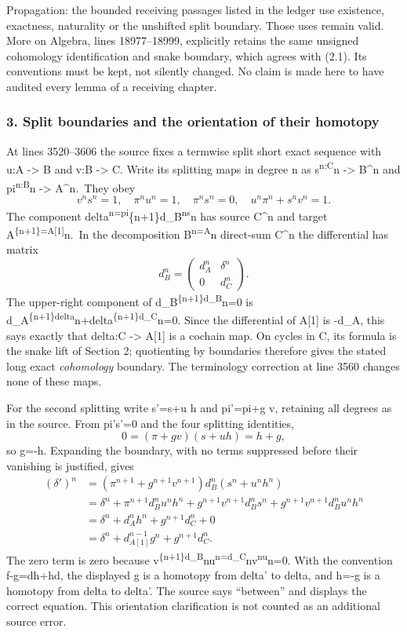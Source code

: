 Propagation: the bounded receiving passages listed in the ledger use existence, exactness, naturality or the unshifted split boundary. Those uses remain valid. More on Algebra, lines 18977--18999, explicitly retains the same unsigned cohomology identification and snake boundary, which agrees with (2.1). Its conventions must be kept, not silently changed. No claim is made here to have audited every lemma of a receiving chapter.

\subsubsection{3. Split boundaries and the orientation of their homotopy}\label{split-boundaries-and-the-orientation-of-their-homotopy}

At lines 3520--3606 the source fixes a termwise split short exact sequence with u:A -\textgreater{} B and v:B -\textgreater{} C. Write its splitting maps in degree n as s\textsuperscript{n:C}n -\textgreater{} B\^{}n and pi\textsuperscript{n:B}n -\textgreater{} A\^{}n.~They obey \[
v^ns^n=1,\quad \pi^nu^n=1,\quad \pi^ns^n=0,\quad
u^n\pi^n+s^nv^n=1.
\] The component delta\textsuperscript{n=pi}\{n+1\}d\_B\textsuperscript{ns}n has source C\^{}n and target A\textsuperscript{\{n+1\}=A{[}1{]}}n.~In the decomposition B\textsuperscript{n=A}n direct-sum C\^{}n the differential has matrix \[
d_B^n=
\begin{pmatrix}d_A^n&\delta^n\\0&d_C^n\end{pmatrix}.
\] The upper-right component of d\_B\textsuperscript{\{n+1\}d\_B}n=0 is d\_A\textsuperscript{\{n+1\}delta}n+delta\textsuperscript{\{n+1\}d\_C}n=0. Since the differential of A{[}1{]} is -d\_A, this says exactly that delta:C -\textgreater{} A{[}1{]} is a cochain map. On cycles in C, its formula is the snake lift of Section 2; quotienting by boundaries therefore gives the stated long exact \emph{cohomology} boundary. The terminology correction at line 3560 changes none of these maps.

For the second splitting write s'=s+u h and pi'=pi+g v, retaining all degrees as in the source. From pi's'=0 and the four splitting identities, \[
0=(\pi+gv)(s+uh)=h+g,
\] so g=-h. Expanding the boundary, with no terms suppressed before their vanishing is justified, gives \[
\begin{aligned}
(\delta')^n
&=(\pi^{n+1}+g^{n+1}v^{n+1})d_B^n(s^n+u^nh^n)\\
&=\delta^n+
  \pi^{n+1}d_B^nu^nh^n+
  g^{n+1}v^{n+1}d_B^ns^n+
  g^{n+1}v^{n+1}d_B^nu^nh^n\\
&=\delta^n+d_A^nh^n+g^{n+1}d_C^n+0\\
&=\delta^n+d_{A[1]}^{n-1}g^n+g^{n+1}d_C^n .
\end{aligned}
\] The zero term is zero because v\textsuperscript{\{n+1\}d\_B}nu\textsuperscript{n=d\_C}nv\textsuperscript{nu}n=0. With the convention f-g=dh+hd, the displayed g is a homotopy from delta' to delta, and h=-g is a homotopy from delta to delta'. The source says ``between'' and displays the correct equation. This orientation clarification is not counted as an additional source error.

